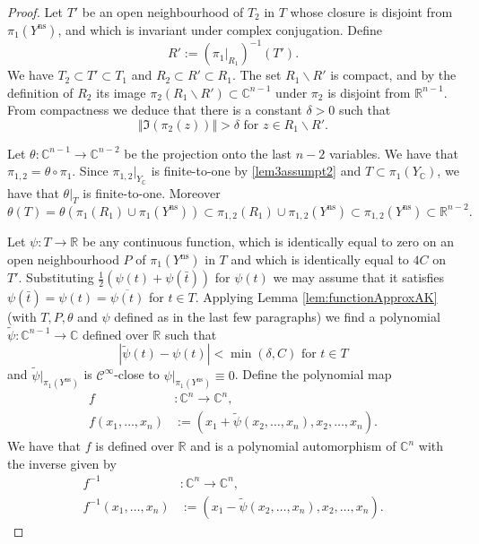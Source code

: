 \documentclass{amsart}
\theoremstyle{plain}
\theoremstyle{definition}
\theoremstyle{remark}
\numberwithin{equation}{thm} %
\newcommand{\R}{\mathbb{R}}
\newcommand{\C}{\mathbb{C}}
\newcommand{\ns}{\mathrm{ns}}
\begin{document}
\begin{proof}
Let $T'$ be an open neighbourhood of $T_2$ in $T$ whose closure is disjoint from $\pi_1(Y^\ns)$, and which is invariant under complex conjugation. Define 
\begin{equation*}
    R':=(\pi_1\vert_{R_1})^{-1}(T').    
\end{equation*}
We have $T_2\subset T'\subset T_1$ and $R_2\subset R'\subset R_1$. The set $R_1\backslash R'$ is compact, and by the definition of $R_2$ its image $\pi_2(R_1\backslash R')\subset \C^{n-1}$ under $\pi_2$ is disjoint from $\R^{n-1}$. From compactness we deduce that there is a constant $\delta>0$ such that
\begin{equation}\label{lem3eqDelta}
    \Vert\Im(\pi_2(z))\Vert>\delta\text{ for }z\in R_1\backslash R'.
\end{equation}

Let $\theta:\C^{n-1}\rightarrow \C^{n-2}$ be the projection onto the last $n-2$ variables. We have that $\pi_{1,2}=\theta\circ\pi_1$. Since $\pi_{1,2}\vert_{Y_\C}$ is finite-to-one by \eqref{lem3assumpt2} and $T\subset\pi_1(Y_\C)$, we have that $\theta\vert_{T}$ is finite-to-one. Moreover
\begin{equation*}
    \theta(T)=\theta(\pi_1(R_1)\cup \pi_1(Y^\ns))\subset \pi_{1,2}(R_1) \cup \pi_{1,2}(Y^\ns)\subset \pi_{1,2}(Y^\ns)\subset \R^{n-2}.
\end{equation*}

Let $\psi:T\rightarrow \R$ be any continuous function, which is identically equal to zero on an open neighbourhood $P$ of $\pi_1(Y^\ns)$ in $T$ and which is identically equal to $4C$ on $T'$. Substituting $\frac{1}{2}(\psi(t)+\psi(\bar t))$ for $\psi(t)$ we may assume that it satisfies $\psi(\bar t)=\psi(t)=\overline{\psi(t)}$ for $t\in T$. Applying Lemma \ref{lem:functionApproxAK} (with $T,P,\theta$ and $\psi$ defined as in the last few paragraphs) we find a polynomial $\tilde \psi:\C^{n-1}\rightarrow \C$ defined over $\R$ such that 
\begin{equation}\label{lem3eqApprox}
    |\tilde \psi(t)-\psi(t)|<\min(\delta,C)\text{ for }t\in T
\end{equation}
and $\tilde\psi\vert_{\pi_1(Y^\ns)}$ is $\mathcal C^\infty$-close to $\psi\vert_{\pi_1(Y^\ns)}\equiv 0$. Define the polynomial map 
\begin{align*}
    f&:\C^n\rightarrow \C^n,\\
    f(x_1,\dots,x_n)&:=(x_1+\tilde \psi(x_2,\dots,x_n),x_2,\dots,x_n).
\end{align*}
We have that $f$ is defined over $\R$ and is a polynomial automorphism of $\C^n$ with the inverse given by
\begin{align*}
    f^{-1}&:\C^n\rightarrow \C^n,\\
    f^{-1}(x_1,\dots,x_n)&:=(x_1-\tilde \psi(x_2,\dots,x_n),x_2,\dots,x_n).
\end{align*}


\end{proof}
\end{document}
